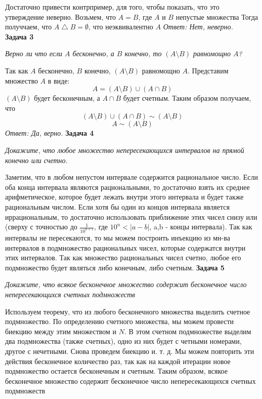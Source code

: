 \documentclass{article}
\begin{document}
Достаточно привести контрпример, для того, чтобы показать, что это утверждение неверно.
Возьмем, что $A = B$, где $A$ и $B$ непустые множества
Тогда получчаем, что $A \bigtriangleup B = \emptyset$, что неэквивалентно $ A$ \newline
\textit{Ответ: Нет, неверно.} \newline
\\
\textbf{Задача 3}
\begin{center}
\textit{Верно ли что если $A$ бесконечно, а $B$ конечно, то $(A \setminus B)$ равномощно $A$?} 
\end{center}
Так как $A$ бесконечно, $B$ конечно, $(A \setminus B)$ равномощно $A$. Представим множество $A$ в виде:
$$A = (A \setminus B) \cup (A \cap B)$$
$ (A \setminus B)$ будет бесконечным, а $A \cap B$ будет счетным.
Таким образом получаем, что 
$$(A \setminus B) \cup (A \cap B) \sim (A \setminus B)$$
$$ A \sim (A \setminus B)$$
\textit{Ответ: Да, верно.}
\newline
\newline
\textbf{Задача 4}
\begin{center}
\textit{Докажите, что любое множество непересекающихся интервалов на прямой конечно или счетно.}
\end{center}
Заметим, что в любом непустом интервале содержится рациональное число. Если оба конца интервала являются рациональными, то достаточно взять их среднее арифметическое, которое будет лежать внутри этого интервала и будет также рациональным числом. Если хотя бы один из концов интервала является иррациональным, то достаточно использовать приближение этих чисел снизу или (сверху с точностью до $\frac{1}{10^{n+1}}$, где $10^{n}<|a-b|$, a,b - концы интервала).
Так как интервалы не пересекаются, то мы можем построить инъекцию из мн-ва интервалов в  подмножество рациональных чисел, которые содержатся внутри этих интервалов. Так как множество рациональных чисел счетно, любое его подмножество будет являться либо конечным, либо счетным.
\newline \newline
\textbf{Задача 5}
\begin{center}
\textit{Докажите, что всякое бесконечное множество содержит бесконечное число непересекающихся счетных подмножеств} 
\end{center}
Используем теорему, что из любого бесконечного множества выделить счетное подмножество. По определению счетного множества, мы можем провести биекцию между этим множеством и $N$. В этом счетном подмножестве выделим два подмножества (также счетных), одно из них будет с четными номерами, другое с нечетными. Снова проведем биекцию и. т. д. Мы можем повторить эти действия бесконечное количество раз, так как на каждой итерации новое подмножество остается бесконечным и счетным. Таким образом, всякое бесконечное множество содержит бесконечное число непересекающихся счетных подмножеств
\end{document}
